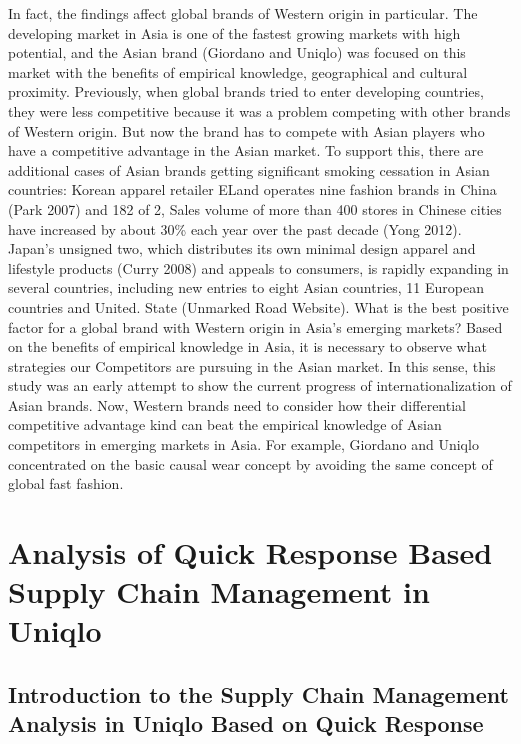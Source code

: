 \documentclass[12pt,a4paper]{article}
\begin{document}
In fact, the findings affect global brands of Western origin in
particular. The developing market in Asia is one of the fastest growing
markets with high potential, and the Asian brand (Giordano and Uniqlo)
was focused on this market with the benefits of empirical knowledge,
geographical and cultural proximity. Previously, when global brands
tried to enter developing countries, they were less competitive because
it was a problem competing with other brands of Western origin. But now
the brand has to compete with Asian players who have a competitive
advantage in the Asian market. To support this, there are additional
cases of Asian brands getting significant smoking cessation in Asian
countries: Korean apparel retailer ELand operates nine fashion brands in
China (Park 2007) and 182 of 2, Sales volume of more than 400 stores in
Chinese cities have increased by about 30\% each year over the past
decade (Yong 2012). Japan's unsigned two, which distributes its own
minimal design apparel and lifestyle products (Curry 2008) and appeals
to consumers, is rapidly expanding in several countries, including new
entries to eight Asian countries, 11 European countries and United.
State (Unmarked Road Website). What is the best positive factor for a
global brand with Western origin in Asia's emerging markets? Based on
the benefits of empirical knowledge in Asia, it is necessary to observe
what strategies our Competitors are pursuing in the Asian market. In
this sense, this study was an early attempt to show the current progress
of internationalization of Asian brands. Now, Western brands need to
consider how their differential competitive advantage kind can beat the
empirical knowledge of Asian competitors in emerging markets in Asia.
For example, Giordano and Uniqlo concentrated on the basic causal wear
concept by avoiding the same concept of global fast fashion.

\hypertarget{analysis-of-quick-response-based-supply-chain-management-in-uniqlo}{%
\section{Analysis of Quick Response Based Supply Chain Management in
Uniqlo}\label{analysis-of-quick-response-based-supply-chain-management-in-uniqlo}}

\hypertarget{introduction-to-the-supply-chain-management-analysis-in-uniqlo-based-on-quick-response}{%
\subsection{Introduction to the Supply Chain Management Analysis in
Uniqlo Based on Quick
Response}\label{introduction-to-the-supply-chain-management-analysis-in-uniqlo-based-on-quick-response}}
\end{document}
